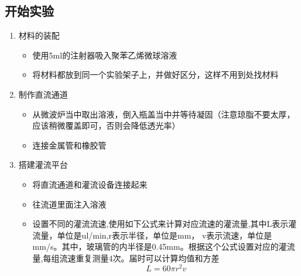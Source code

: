 \documentclass[12pt]{article}
\begin{document}
\subsection{开始实验}
\begin{enumerate}
    \item 材料的装配
    \begin{itemize}
   
    \item 使用5ml的注射器吸入聚苯乙烯微球溶液
    \item 将材料都放到同一个实验架子上，并做好区分，这样不用到处找材料
    
    \end{itemize}

    \item 制作直流通道
    \begin{itemize}
        \item 从微波炉当中取出溶液，倒入瓶盖当中并等待凝固（注意琼脂不要太厚，应该稍微覆盖即可，否则会降低透光率）
        \item 连接金属管和橡胶管
    \end{itemize}

    \item 搭建灌流平台
    \begin{itemize}
        
        \item 将直流通道和灌流设备连接起来
        \item 往流道里面注入溶液
        \item 设置不同的灌流流速,使用如下公式来计算对应流速的灌流量,其中L表示灌流量，单位是ul/min,r表示半径，单位是mm，
        v表示流速，单位是mm/s。其中，玻璃管的内半径是0.45mm。根据这个公式设置对应的灌流量,每组流速重复测量4次。届时可以计算均值和方差
        \begin{equation}
            L=60 \pi r^2 v
        \end{equation}


\end{itemize}
\end{enumerate}
\end{document}
